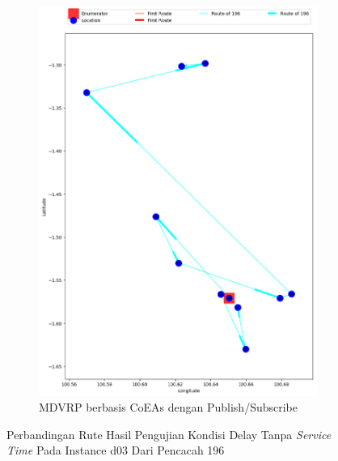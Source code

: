 \begin{figure}[H]\ContinuedFloat
	\centering
	\begin{subfigure}[t]{\textwidth}
		\centering
		\includegraphics[width=\textwidth]{Resources/Images/delayed_3/real_m15_n100_delayed_3_196_pubsub_coes}
		\caption{MDVRP berbasis CoEAs dengan Publish/Subscribe}
		\label{fig:real_m15_n100_delayed_3_196_pubsub_coes}
	\end{subfigure}
	\caption{Perbandingan Rute Hasil Pengujian Kondisi Delay Tanpa \textit{Service Time} Pada Instance d03 Dari Pencacah 196}
	\label{fig:real_m15_n100_delayed_3_196_contd}
\end{figure}


